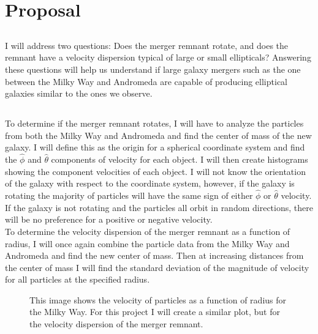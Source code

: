\documentclass[twocolumn]{aastex63}
\begin{document}
\section{Proposal}

\subsection{}
I will address two questions: Does the merger remnant rotate, and does the remnant have a velocity dispersion typical of large or small ellipticals? Answering these questions will help us understand if large galaxy mergers such as the one between the Milky Way and Andromeda are capable of producing elliptical galaxies similar to the ones we observe.

\subsection{}

To determine if the merger remnant rotates, I will have to analyze the particles from both the Milky Way and Andromeda and find the center of mass of the new galaxy. I will define this as the origin for a spherical coordinate system and find the $\hat{\phi}$ and $\hat{\theta}$ components of velocity for each object. I will then create histograms showing the component velocities of each object. I will not know the orientation of the galaxy with respect to the coordinate system, however, if the galaxy is rotating the majority of particles will have the same sign of either $\hat{\phi}$ or $\hat{\theta}$ velocity. If the galaxy is not rotating and the particles all orbit in random directions, there will be no preference for a positive or negative velocity.\\

To determine the velocity dispersion of the merger remnant as a function of radius, I will once again combine the particle data from the Milky Way and Andromeda and find the new center of mass. Then at increasing distances from the center of mass I will find the standard deviation of the magnitude of velocity for all particles at the specified radius.\\

\begin{figure}
    \centering
    \caption{This image shows the velocity of particles as a function of radius for the Milky Way. For this project I will create a similar plot, but for the velocity dispersion of the merger remnant.}
    \label{velocity}
\end{figure}
\end{document}
